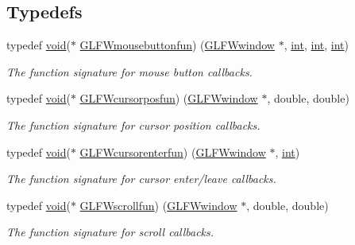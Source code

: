 \subsection*{Typedefs}
\begin{DoxyCompactItemize}
\item 
typedef \hyperlink{wglew_8h_aeea6e3dfae3acf232096f57d2d57f084}{void}($\ast$ \hyperlink{group__input_ga39893a4a7e7c3239c98d29c9e084350c}{G\+L\+F\+Wmousebuttonfun}) (\hyperlink{group__window_ga3c96d80d363e67d13a41b5d1821f3242}{G\+L\+F\+Wwindow} $\ast$, \hyperlink{wglew_8h_a500a82aecba06f4550f6849b8099ca21}{int}, \hyperlink{wglew_8h_a500a82aecba06f4550f6849b8099ca21}{int}, \hyperlink{wglew_8h_a500a82aecba06f4550f6849b8099ca21}{int})
\begin{DoxyCompactList}\small\item\em The function signature for mouse button callbacks. \end{DoxyCompactList}\item 
typedef \hyperlink{wglew_8h_aeea6e3dfae3acf232096f57d2d57f084}{void}($\ast$ \hyperlink{group__input_ga4cfad918fa836f09541e7b9acd36686c}{G\+L\+F\+Wcursorposfun}) (\hyperlink{group__window_ga3c96d80d363e67d13a41b5d1821f3242}{G\+L\+F\+Wwindow} $\ast$, double, double)
\begin{DoxyCompactList}\small\item\em The function signature for cursor position callbacks. \end{DoxyCompactList}\item 
typedef \hyperlink{wglew_8h_aeea6e3dfae3acf232096f57d2d57f084}{void}($\ast$ \hyperlink{group__input_ga51ab436c41eeaed6db5a0c9403b1c840}{G\+L\+F\+Wcursorenterfun}) (\hyperlink{group__window_ga3c96d80d363e67d13a41b5d1821f3242}{G\+L\+F\+Wwindow} $\ast$, \hyperlink{wglew_8h_a500a82aecba06f4550f6849b8099ca21}{int})
\begin{DoxyCompactList}\small\item\em The function signature for cursor enter/leave callbacks. \end{DoxyCompactList}\item 
typedef \hyperlink{wglew_8h_aeea6e3dfae3acf232096f57d2d57f084}{void}($\ast$ \hyperlink{group__input_ga4687e2199c60a18a8dd1da532e6d75c9}{G\+L\+F\+Wscrollfun}) (\hyperlink{group__window_ga3c96d80d363e67d13a41b5d1821f3242}{G\+L\+F\+Wwindow} $\ast$, double, double)
\begin{DoxyCompactList}\small\item\em The function signature for scroll callbacks. \end{DoxyCompactList}\item 

\end{DoxyCompactItemize}
